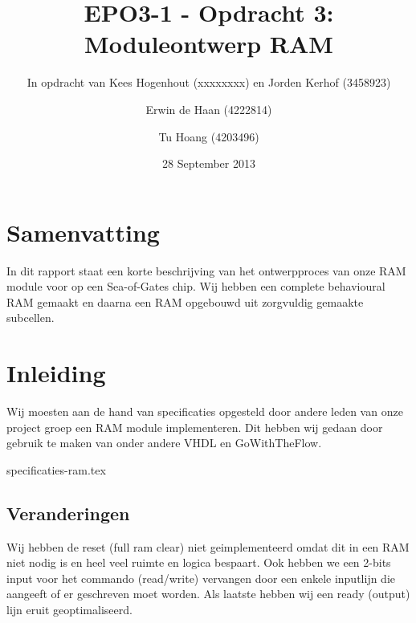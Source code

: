 \documentclass{scrartcl}  %
\author{Erwin {de Haan} (4222814) \and {Tu Hoang} (4203496)}
\title{EPO3-1 - Opdracht 3: Moduleontwerp RAM}
\subtitle{In opdracht van Kees Hogenhout (xxxxxxxx) en Jorden Kerhof (3458923)}
\date{28 September 2013}
\begin{document}
\maketitle
{}
\section*{Samenvatting}
In dit rapport staat een korte beschrijving van het ontwerpproces van onze RAM module voor op een Sea-of-Gates chip.
Wij hebben een complete behavioural RAM gemaakt en daarna een RAM opgebouwd uit zorgvuldig gemaakte subcellen.
\newpage
\setlength{\cftbeforetoctitleskip}{-3em}
\tableofcontents

\section{Inleiding}
Wij moesten aan de hand van specificaties opgesteld door andere leden van onze project groep een RAM module implementeren.
Dit hebben wij gedaan door gebruik te maken van onder andere VHDL en GoWithTheFlow.

\newpage
{}

{specificaties-ram.tex}

\subsection{Veranderingen}
Wij hebben de reset (full ram clear) niet geimplementeerd omdat dit in een RAM niet nodig is en heel veel ruimte en logica bespaart.
Ook hebben we een 2-bits input voor het commando (read/write) vervangen door een enkele inputlijn die aangeeft of er geschreven moet worden.
Als laatste hebben wij een ready (output) lijn eruit geoptimaliseerd.
\end{document}

